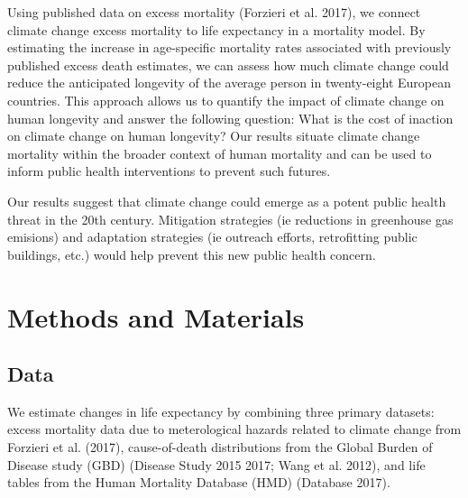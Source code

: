 \documentclass[12pt,]{article}
\begin{document}
Using published data on excess mortality (Forzieri et al. 2017), we
connect climate change excess mortality to life expectancy in a
mortality model. By estimating the increase in age-specific mortality
rates associated with previously published excess death estimates, we
can assess how much climate change could reduce the anticipated
longevity of the average person in twenty-eight European countries. This
approach allows us to quantify the impact of climate change on human
longevity and answer the following question: What is the cost of
inaction on climate change on human longevity? Our results situate
climate change mortality within the broader context of human mortality
and can be used to inform public health interventions to prevent such
futures.

Our results suggest that climate change could emerge as a potent public
health threat in the 20th century. Mitigation strategies (ie reductions
in greenhouse gas emisions) and adaptation strategies (ie outreach
efforts, retrofitting public buildings, etc.) would help prevent this
new public health concern.

\hypertarget{methods-and-materials}{%
\section{Methods and Materials}\label{methods-and-materials}}

\hypertarget{data}{%
\subsection{Data}\label{data}}

We estimate changes in life expectancy by combining three primary
datasets: excess mortality data due to meterological hazards related to
climate change from Forzieri et al. (2017), cause-of-death distributions
from the Global Burden of Disease study (GBD) (Disease Study 2015 2017;
Wang et al. 2012), and life tables from the Human Mortality Database
(HMD) (Database 2017).
\end{document}
